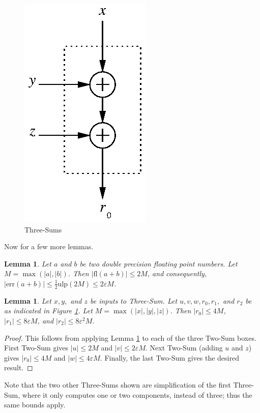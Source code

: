 \documentclass[11pt]{article}
\newtheorem{lem}[thm]{Lemma}
\theoremstyle{definition}
\newcommand{\fl}{\mathrm{fl}}
\newcommand{\err}{\mathrm{err}}
\newcommand{\ulp}{\mathrm{ulp}}
\newcommand{\eps}{\varepsilon}
\begin{document}
\begin{figure}
\begin{center}
    \includegraphics{three-sum-3.eps}
    \caption{\label{three_sum_fig}{\sc Three-Sum}s}
  \end{center}
\end{figure}

Now for a few more lemmas.
\begin{lem}
  \label{two_sum_bound}
  Let $a$ and $b$ be two double precision floating point numbers.
  Let $M = \max(|a|, |b|)$.  Then $|\fl(a+b)| \le 2M$, and consequently, 
  $|\err(a+b)| \le \frac{1}{2}\ulp(2M) \le 2 \eps M$.
\end{lem}

\begin{lem}
  \label{three_sum_bound}
  Let $x, y,$ and $z$ be inputs to {\sc Three-Sum}.
  Let $u, v, w, r_0, r_1,$ and $r_2$ be as indicated in Figure 
  \ref{three_sum_fig}.  Let $M = \max (|x|, |y|, |z|)$.  Then
  $|r_0| \le 4M$, $|r_1| \le 8 \eps M$, and $|r_2| \le 8 \eps^2 M$.
\end{lem}
\begin{proof} This follows from applying Lemma \ref{two_sum_bound}
to each of the three {\sc Two-Sum} boxes.  
First {\sc Two-Sum} gives $|u| \le 2M$ and
$|v| \le 2\eps M$.  Next {\sc Two-Sum} (adding $u$ and $z$) gives
$|r_0| \le 4M$ and $|w| \le 4\eps M$.  Finally, the last {\sc Two-Sum}
gives the desired result.
\end{proof}

Note that the two other {\sc Three-Sum}s shown are simplification
of the first {\sc Three-Sum}, where it only computes one or two components, 
instead of three; thus the same bounds apply.
\end{document}
